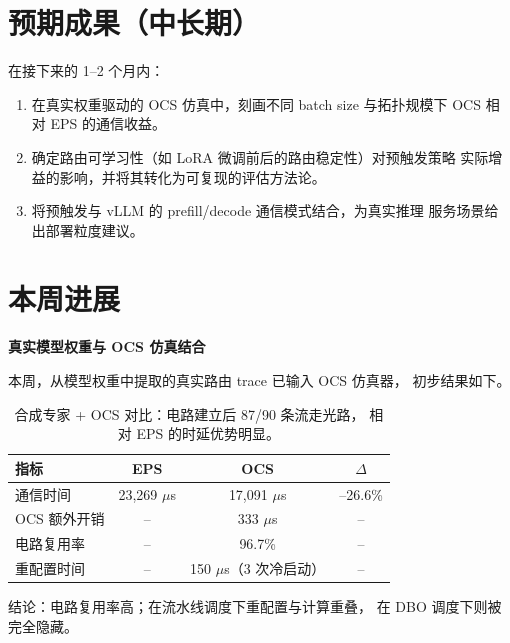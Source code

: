\documentclass[11pt]{article}
\begin{document}

\section{预期成果（中长期）}

在接下来的 1--2 个月内：
\begin{enumerate}
  \item 在真实权重驱动的 OCS 仿真中，刻画不同 batch size 与拓扑规模下
        OCS 相对 EPS 的通信收益。
  \item 确定路由可学习性（如 LoRA 微调前后的路由稳定性）对预触发策略
        实际增益的影响，并将其转化为可复现的评估方法论。
  \item 将预触发与 vLLM 的 prefill/decode 通信模式结合，为真实推理
        服务场景给出部署粒度建议。
\end{enumerate}

\section{本周进展}

\textbf{真实模型权重与 OCS 仿真结合}

本周，从模型权重中提取的真实路由 trace 已输入 OCS 仿真器，
初步结果如下。

\begin{table}[htbp]
\centering
\small
\begin{tabular}{lccc}
\toprule
\textbf{指标} & \textbf{EPS} & \textbf{OCS} & \textbf{$\Delta$} \\
\midrule
通信时间      & 23,269 $\mu$s & 17,091 $\mu$s & --26.6\% \\
OCS 额外开销  & --            & 333 $\mu$s    & -- \\
电路复用率    & --            & 96.7\%        & -- \\
重配置时间    & --            & 150 $\mu$s（3 次冷启动） & -- \\
\bottomrule
\end{tabular}
\caption{合成专家 + OCS 对比：电路建立后 87/90 条流走光路，
相对 EPS 的时延优势明显。}
\label{tab:ocs_eps}
\end{table}

\noindent 结论：电路复用率高；在流水线调度下重配置与计算重叠，
在 DBO 调度下则被完全隐藏。

\end{document}
